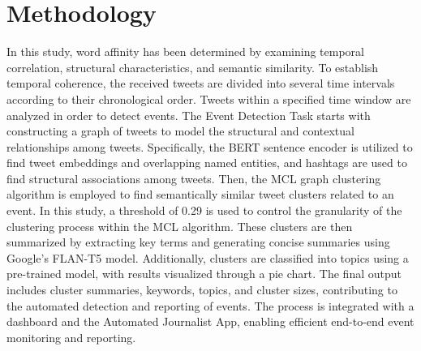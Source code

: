 
\section{Methodology}

In this study, word affinity has been determined by examining temporal correlation, structural characteristics, and semantic similarity. To establish temporal coherence, the received tweets are divided into several time intervals according
to their chronological order. Tweets within a specified time window are analyzed in order to detect events. The Event Detection Task starts with constructing a graph of tweets to model the structural and contextual relationships
among tweets. Specifically, the BERT sentence encoder is utilized to find tweet embeddings and overlapping named entities, and hashtags are used to find structural associations among tweets. Then, the MCL graph clustering algorithm is employed to find semantically similar tweet clusters related to an event. In this study, a threshold of 0.29 is used to control the granularity of the clustering process within the MCL algorithm. These clusters are then summarized by extracting key terms and generating concise summaries using Google’s FLAN-T5 model. Additionally, clusters are classified into topics using a pre-trained model, with results visualized through a pie chart. The final output includes cluster summaries, keywords, topics, and cluster sizes, contributing to the automated detection and reporting of events. The process is integrated with a dashboard and the Automated Journalist App, enabling efficient end-to-end event monitoring and reporting.

